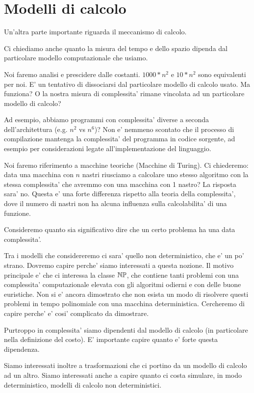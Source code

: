 \section{Modelli di calcolo}

Un'altra parte importante riguarda il meccanismo di calcolo.

Ci chiediamo anche quanto la misura del tempo e dello spazio dipenda dal particolare modello
computazionale che usiamo.

Noi faremo analisi e prescidere dalle costanti. $1000*n^{2}$ e $10*n^{2}$ sono equivalenti per noi.
E' un tentativo di dissociarsi dal particolare modello di calcolo usato. Ma funziona? O la nostra
misura di complessita' rimane vincolata ad un particolare modello di calcolo?

Ad esempio, abbiamo programmi con complessita' diverse a seconda dell'architettura (e.g. $n^{2}$ vs
$n^{6}$)? Non e' nemmeno scontato che il processo di compilazione mantenga la
complessita' del programma in codice sorgente, ad esempio per considerazioni legate
all'implementazione del linguaggio.

Noi faremo riferimento a macchine teoriche (Macchine di Turing). Ci chiederemo: data una macchina
con $n$ nastri riusciamo a calcolare uno stesso algoritmo con la stessa complessita' che avremmo con
una macchina con 1 nastro? La risposta sara' no. Questa e' una forte differenza rispetto alla teoria
della complessita', dove il numero di nastri non ha alcuna influenza sulla calcolabilita' di una
funzione.

Consideremo quanto sia significativo dire che un certo problema ha una data complessita'.

Tra i modelli che considereremo ci sara' quello non deterministico, che e' un po' strano. Dovremo
capire perche' siamo interessati a questa nozione. Il motivo principale e' che ci interessa la
classe $\mathbb{NP}$, che contiene tanti problemi con una complessita' computazionale elevata con gli algoritmi
odierni e con delle buone euristiche. Non si e' ancora dimostrato che non esista un modo di
risolvere questi problemi in tempo polinomiale con una macchina deterministica. Cercheremo di capire
perche' e' cosi' complicato da dimostrare.

Purtroppo in complessita' siamo dipendenti dal modello di calcolo (in particolare nella definizione
del costo). E' importante capire quanto e' forte questa dipendenza.

Siamo interessati inoltre a trasformazioni che ci portino da un modello di calcolo ad un altro.
Siamo interessati anche a capire quanto ci costa simulare, in modo deterministico, modelli di
calcolo non deterministici.

